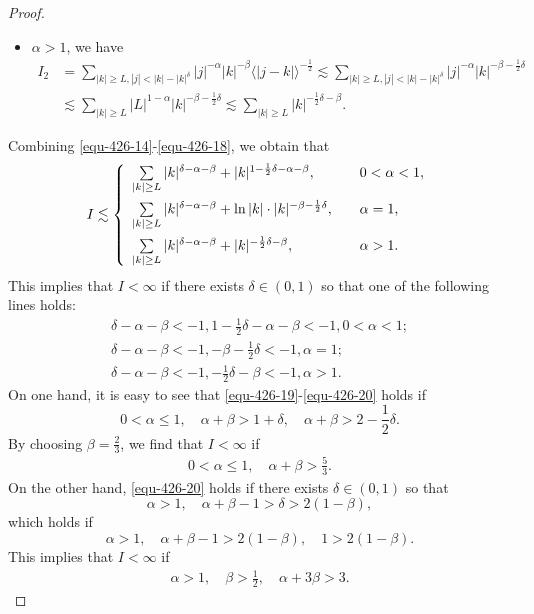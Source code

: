 \documentclass[preprint,12pt]{elsarticle}
\begin{document}
\begin{proof}
\begin{itemize}
       \item $\alpha>1$, we have
    \begin{align}\label{equ-426-18}
          I_2&= \sum_{|k|\ge L,|j|<|k|-|k|^\delta}|j|^{-\alpha}|k|^{-\beta}\langle |j-k|\rangle^{-\frac{1}{2}}\lesssim \sum_{|k|\ge L,|j|<|k|-|k|^{\delta}}|j|^{-\alpha}|k|^{-\beta-\frac{1}{2}\delta}\nonumber\\
          &\lesssim \sum_{|k|\ge L }|L|^{1-\alpha}|k|^{-\beta-\frac{1}{2}\delta}\lesssim\sum_{|k|\ge L}|k|^{-\frac{1}{2}\delta-\beta}.
    \end{align}
     \end{itemize}
Combining \eqref{equ-426-14}-\eqref{equ-426-18}, we obtain that
\begin{align*}
I\lesssim
\left\{
\begin{array}{ll}
\sum_{|k|\geq L}\limits|k|^{\delta-\alpha-\beta}+ |k|^{1-\frac{1}{2}\delta-\alpha-\beta}, &  \quad 0<\alpha<1,\vspace{1ex}\\
\sum_{|k|\geq L}\limits|k|^{\delta-\alpha-\beta}+ \ln|k|\cdot|k|^{-\beta-\frac{1}{2}\delta}, & \quad \alpha=1,\vspace{1ex}\\
\sum_{|k|\geq L}\limits|k|^{\delta-\alpha-\beta}+|k|^{-\frac{1}{2}\delta-\beta}, & \quad \alpha>1.
\end{array}
\right.
\end{align*}
This implies that $I<\infty$ if there exists $\delta\in(0,1)$ so that one of the following lines holds:
\begin{align}
\delta-\alpha-\beta<-1, 1-\frac{1}{2}\delta-\alpha-\beta<-1,0<\alpha<1; \label{equ-426-19}\\
\delta-\alpha-\beta<-1,-\beta-\frac{1}{2}\delta<-1,\alpha=1; \label{equ-426-20}\\
\delta-\alpha-\beta<-1, -\frac{1}{2}\delta-\beta<-1, \alpha>1. \label{equ-426-21}
\end{align}
On one hand, it is easy to see that \eqref{equ-426-19}-\eqref{equ-426-20} holds if
$$
0<\alpha\leq 1, \quad \alpha+\beta>1+\delta, \quad \alpha+\beta>2-\frac{1}{2}\delta.
$$
By choosing $\beta=\frac{2}{3}$, we find that $I<\infty$ if
\begin{align} \label{equ-426-22}
0<\alpha\leq 1, \quad \alpha+\beta>\frac{5}{3}.
\end{align}
On the other hand, \eqref{equ-426-20} holds if there exists $\delta\in(0,1)$ so that
$$
\alpha>1, \quad \alpha+\beta-1>\delta>2(1-\beta),
$$
which holds if
$$
\alpha>1, \quad \alpha+\beta-1>2(1-\beta), \quad 1>2(1-\beta).
$$
This implies that $I<\infty$ if
\begin{align} \label{equ-426-23}
\alpha>1, \quad \beta>\frac{1}{2}, \quad \alpha+3\beta>3.
\end{align}



\end{proof}
\end{document}
